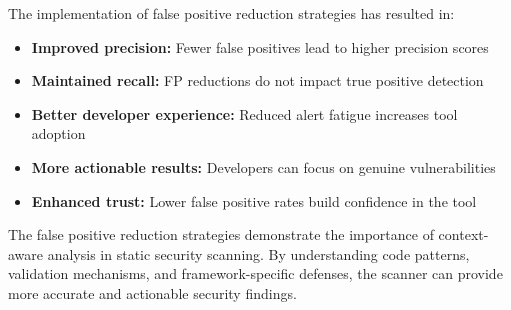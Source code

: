 The implementation of false positive reduction strategies has resulted in:
\begin{itemize}
	\item \textbf{Improved precision:} Fewer false positives lead to higher precision scores
	\item \textbf{Maintained recall:} FP reductions do not impact true positive detection
	\item \textbf{Better developer experience:} Reduced alert fatigue increases tool adoption
	\item \textbf{More actionable results:} Developers can focus on genuine vulnerabilities
	\item \textbf{Enhanced trust:} Lower false positive rates build confidence in the tool
\end{itemize}

The false positive reduction strategies demonstrate the importance of context-aware analysis in static security scanning. By understanding code patterns, validation mechanisms, and framework-specific defenses, the scanner can provide more accurate and actionable security findings.

